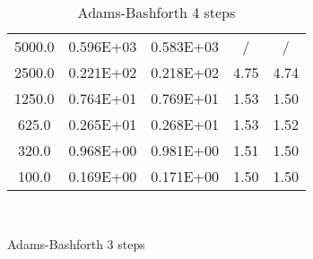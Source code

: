 \documentclass[pdftex,preprint,3p,times,numbers]{elsarticle}
\begin{document}
\begin{table}[!ht]
\begin{subtable}[b]{0.45\textwidth}
{\begin{tabular}{ccccc}
      \hline
      5000.0          &  0.596E+03    &  0.583E+03    & /             & /             \\
      2500.0          &  0.221E+02    &  0.218E+02    & 4.75          & 4.74          \\
      1250.0          &  0.764E+01    &  0.769E+01    & 1.53          & 1.50          \\
       625.0          &  0.265E+01    &  0.268E+01    & 1.53          & 1.52          \\
       320.0          &  0.968E+00    &  0.981E+00    & 1.51          & 1.50          \\
       100.0          &  0.169E+00    &  0.171E+00    & 1.50          & 1.50          \\
      \bottomrule
    \end{tabular}}
  \end{subtable}\\
  \begin{subtable}[b]{0.45\textwidth}
    \centering
    \caption{Adams-Bashforth 3 steps}\label{tab:oscillation-ab-3}
  \end{subtable}\quad%
  \begin{subtable}[b]{0.45\textwidth}
    \centering
    \caption{Adams-Bashforth 4 steps}\label{tab:oscillation-ab-4}
\end{subtable}
\end{table}
\end{document}
